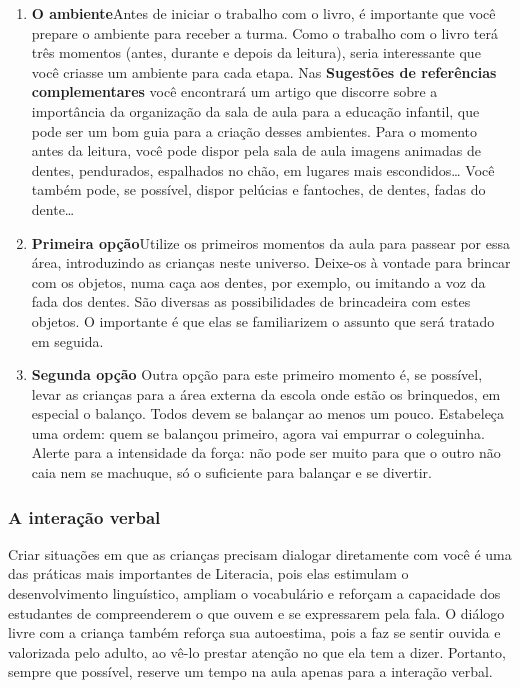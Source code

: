 \documentclass[11pt]{extarticle}
\begin{document}
\begin{enumerate}
\item \textbf{O ambiente}\quad Antes de iniciar o trabalho com o livro, é importante que você 
prepare o ambiente para receber a turma. Como o trabalho com o livro terá 
três momentos (antes, durante e depois da leitura), seria interessante que você 
criasse um ambiente para cada etapa. Nas \textbf{Sugestões de referências complementares} 
você encontrará um artigo que discorre sobre a importância da organização da sala 
de aula para a educação infantil, que pode ser um bom guia para a criação desses 
ambientes. Para o momento antes da leitura, você pode dispor pela sala de aula
imagens animadas de dentes, pendurados, espalhados no chão, em lugares
mais escondidos\dots{} Você também pode, se possível, dispor pelúcias e fantoches, 
de dentes, fadas do dente\dots{}

\item \textbf{Primeira opção}\quad Utilize os primeiros 
momentos da aula para passear por essa área, introduzindo as crianças
neste universo. Deixe-os à vontade para brincar com os objetos,
numa caça aos dentes, por exemplo, ou imitando a voz da fada dos
dentes. São diversas as possibilidades de brincadeira com estes
objetos. O importante é que elas se familiarizem o assunto
que será tratado em seguida.
\item \textbf{Segunda opção}\quad 
Outra opção para este primeiro momento é, se possível, 
levar as crianças para a área externa da escola onde estão os brinquedos,
em especial o balanço. Todos devem se balançar ao menos um pouco. 
Estabeleça uma ordem: quem se balançou primeiro, agora vai 
empurrar o coleguinha. Alerte para a intensidade da força: não pode ser muito
para que o outro não caia nem se machuque, só o suficiente para balançar 
e se divertir.

\end{enumerate}


\subsubsection{A interação verbal} 
Criar situações em que as crianças precisam dialogar diretamente com 
você é uma das práticas mais importantes de Literacia, pois elas estimulam 
o desenvolvimento linguístico, ampliam o vocabulário e reforçam a 
capacidade dos estudantes de compreenderem o que ouvem e se expressarem 
pela fala. O diálogo livre com a criança também reforça sua autoestima, pois 
a faz se sentir ouvida e valorizada pelo adulto, ao vê-lo prestar atenção 
no que ela tem a dizer. Portanto, sempre que possível, reserve um tempo na 
aula apenas para a interação verbal. 
\end{document}
